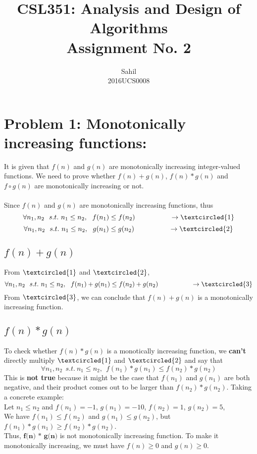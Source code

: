 \documentclass[12pt]{report}
\title{\centering CSL351: Analysis and Design of Algorithms \\Assignment No. 2}
\author{\LARGE Sahil\\2016UCS0008}
\begin{document}
\maketitle

\section{Problem 1: Monotonically increasing functions:}
It is given that $f(n)$ and $g(n)$ are monotonically increasing integer-valued functions. We need to prove whether $f(n) + g(n)$, $f(n)*g(n)$ and $f \circ g(n)$ are monotonically increasing or not. 
\\ \\
Since $f(n)$ and $g(n)$ are monotonically increasing functions, thus
 \[\forall n_{1},n_{2} \ \ s.t. \ n_{1} \leq n_{2}, \ \ f(n_{1}) \leq f(n_{2}) \ \ \ \ \ \ \ \ \ \ \ \ \ \ \ \rightarrow \textcircled{1}\]
\[\forall n_{1},n_{2} \ \ s.t. \ n_{1} \leq n_{2}, \ \ g(n_{1}) \leq g(n_{2}) \ \ \ \ \ \ \ \ \ \ \ \ \ \ \ \rightarrow \textcircled{2}\]

\subsection{$f(n) + g(n)$}
From $\textcircled{1}$ and $\textcircled{2}$, 
\[\forall n_{1},n_{2} \ \ s.t. \ n_{1} \leq n_{2}, \ \ f(n_{1}) + g(n_{1}) \leq f(n_{2}) + g(n_{2}) \ \ \ \ \ \ \ \ \ \ \ \ \ \ \ \rightarrow \textcircled{3}\]
From $\textcircled{3}$, we can conclude that $f(n) + g(n)$ is a monotonically increasing function. 

\subsection{$f(n) * g(n)$}
To check whether $f(n) * g(n)$ is a monotically increasing function, we \textbf{can't} directly multiply $\textcircled{1}$ and $\textcircled{2}$ and say that 
\[\forall n_{1},n_{2} \ \ s.t. \ n_{1} \leq n_{2}, \ \ f(n_{1}) * g(n_{1}) \leq f(n_{2}) * g(n_{2})\]
This is \textbf{not true} because it might be the case that $f(n_{1})$ and $g(n_{1})$ are both negative, and their product comes out to be larger than $f(n_{2}) * g(n_{2})$. Taking a concrete example: 
\\
Let $n_{1} \leq n_{2}$ and $f(n_{1}) = -1$, $g(n_{1}) = -10$, $f(n_{2}) = 1$, $g(n_{2}) = 5$, 
\\
We have $f(n_{1}) \leq f(n_{2})$ and $g(n_{1}) \leq g(n_{2})$, but $f(n_{1}) * g(n_{1}) \geq f(n_{2}) * g(n_{2})$.
\\
Thus, $\textbf{f(n) * g(n)}$ is not monotonically increasing function. To make it monotonically increasing, we must have $f(n) \geq 0$ and $g(n) \geq 0$. 
\end{document}
